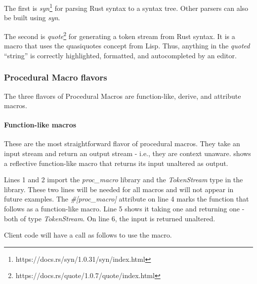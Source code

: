 The first is \textit{syn}\footnote{https://docs.rs/syn/1.0.31/syn/index.html} for parsing Rust syntax to a syntax tree.
Other parsers can also be built using \textit{syn}.

The second is \textit{quote}\footnote{https://docs.rs/quote/1.0.7/quote/index.html} for generating a token stream from Rust syntax.
It is a macro that uses the quasiquotes concept from Lisp.
Thus, anything in the \textit{quoted} ``string'' is correctly highlighted, formatted, and autocompleted by an editor.

\subsubsection{Procedural Macro flavors}
\label{sec:procedural-macro-flavors}

\newcommand{\functionh}[1]{\highlight[Yellow!100!]{#1}}
\newcommand{\inputh}[1]{\highlight[Blue!40!]{#1}}
\newcommand{\outputh}[1]{\highlight[Green!40!]{#1}}
\newcommand{\contexth}[1]{\highlight[Red!40!]{#1}}

The three flavors of Procedural Macros are function-like, derive, and attribute macros.

\paragraph{Function-like macros}
These are the most straightforward flavor of procedural macros.
They take an input stream and return an output stream - i.e., they are context unaware.
 shows a reflective function-like macro that returns its input unaltered as output.


Lines 1 and 2 import the \textit{proc\_macro} library and the \textit{TokenStream} type in the library.
These two lines will be needed for all macros and will not appear in future examples.
The \textit{\#[proc\_macro]} attribute on line 4 marks the function that follows as a function-like macro.
Line 5 shows it taking one \inputh{input} and returning one \outputh{output} - both of type \textit{TokenStream}.
On line 6, the input is returned unaltered.

Client code will have a call as follows to use the macro.


